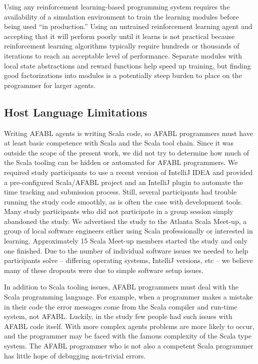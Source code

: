 Using any reinforcement learning-based programming system requires the availability of a simulation environment to train the learning modules before being used ``in production.'' Using an untrained reinforcement learning agent and accepting that it will perform poorly until it learns is not practical because reinforcement learning algorithms typically require hundreds or thousands of iterations to reach an acceptable level of performance. Separate modules with local state abstractions and reward functions help speed up training, but finding good factorizations into modules is a potentially steep burden to place on the programmer for larger agents.

\subsection{Host Language Limitations}

Writing AFABL agents is writing Scala code, so AFABL programmers must have at least basic competence with Scala and the Scala tool chain. Since it was outside the scope of the present work, we did not try to determine how much of the Scala tooling can be hidden or automated for AFABL programmers. We required study participants to use a recent version of IntelliJ IDEA and provided a pre-configured Scala/AFABL project and an IntelliJ plugin to automate the time tracking and submission process. Still, several participants had trouble running the study code smoothly, as is often the case with development tools. Many study participants who did not participate in a group session simply abandoned the study. We advertised the study to the Atlanta Scala Meet-up, a group of local software engineers either using Scala professionally or interested in learning. Approximately 15 Scala Meet-up members started the study and only one finished. Due to the number of individual software issues we needed to help participants solve -- differing operating systems, IntelliJ versions, etc -- we believe many of these dropouts were due to simple software setup issues.

In addition to Scala tooling issues, AFABL programmers must deal with the Scala programming language. For example, when a programmer makes a mistake in their code the error messages come from the Scala compiler and run-time system, not AFABL. Luckily, in the study few people had such issues with AFABL code itself. With more complex agents problems are more likely to occur, and the programmer may be faced with the famous complexity of the Scala type system. The AFABL programmer who is not also a competent Scala programmer has little hope of debugging non-trivial errors.

